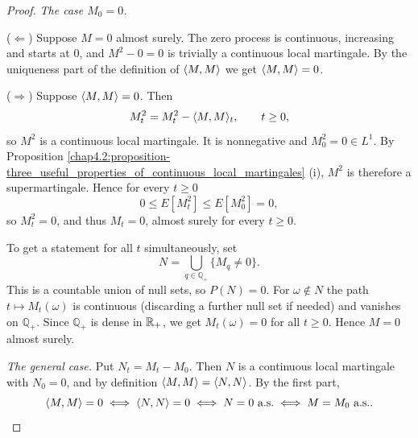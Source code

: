 \begin{proof}
\textit{The case $M_0=0$.}

($\Leftarrow$) Suppose $M=0$ almost surely. The zero process is continuous, increasing and starts at $0$, and $M^2-0=0$ is trivially a continuous local martingale. By the uniqueness part of the definition of $\langle M,M\rangle$ we get $\langle M,M\rangle=0$.

($\Rightarrow$) Suppose $\langle M,M\rangle=0$. Then
\[
  M_t^2 = M_t^2-\langle M,M\rangle_t, \qquad t\geq 0,
\]
so $M^2$ is a continuous local martingale. It is nonnegative and $M_0^2=0\in L^1$. By Proposition \ref{chap4.2:proposition-three_useful_properties_of_continuous_local_martingales} (i), $M^2$ is therefore a supermartingale. Hence for every $t\geq 0$
$$0\leq E[M_t^2]\leq E[M_0^2]=0,$$
so $M_t^2=0$, and thus $M_t=0$, almost surely for every $t\geq 0$.

To get a statement for all $t$ simultaneously, set
$$N=\bigcup_{q\in\mathbb{Q}_+}\{M_q\neq 0\}.$$
This is a countable union of null sets, so $P(N)=0$. For $\omega\notin N$ the path $t\mapsto M_t(\omega)$ is continuous (discarding a further null set if needed) and vanishes on $\mathbb{Q}_+$. Since $\mathbb{Q}_+$ is dense in $\mathbb{R}_+$, we get $M_t(\omega)=0$ for all $t\geq 0$. Hence $M=0$ almost surely.

\medskip
\textit{The general case.} Put $N_t=M_t-M_0$. Then $N$ is a continuous local martingale with $N_0=0$, and by definition $\langle M,M\rangle=\langle N,N\rangle$. By the first part,
$$\langle M,M\rangle=0 \iff \langle N,N\rangle=0 \iff N=0 \text{ a.s.} \iff M=M_0  \text{ a.s.}.$$
\end{proof}


